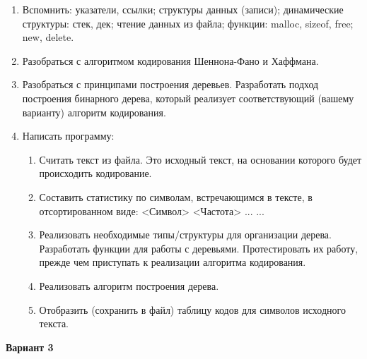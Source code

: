 \begin{enumerate}
    \item Вспомнить: указатели, ссылки; структуры данных (записи); динамические структуры: стек, дек; чтение данных из файла; функции: malloc, sizeof, free; new, delete.
    \item Разобраться с алгоритмом кодирования Шеннона-Фано и Хаффмана.
    \item Разобраться с принципами построения деревьев. Разработать подход построения бинарного дерева, который реализует соответствующий (вашему варианту) алгоритм кодирования.
    \item Написать программу:
    \begin{enumerate}
        \item Считать текст из файла. Это исходный текст, на основании которого будет происходить кодирование.
        \item Составить статистику по символам, встречающимся в тексте, в отсортированном виде: <Символ> <Частота> ... ...
        \item Реализовать необходимые типы/структуры для организации дерева. Разработать функции для работы с деревьями. Протестировать их работу, прежде чем приступать к реализации алгоритма кодирования.
        \item Реализовать алгоритм построения дерева.
        \item Отобразить (сохранить в файл) таблицу кодов для символов исходного текста.
    \end{enumerate}
\end{enumerate}

\newpage

\textbf{Вариант 3}



\newpage





\newpage



